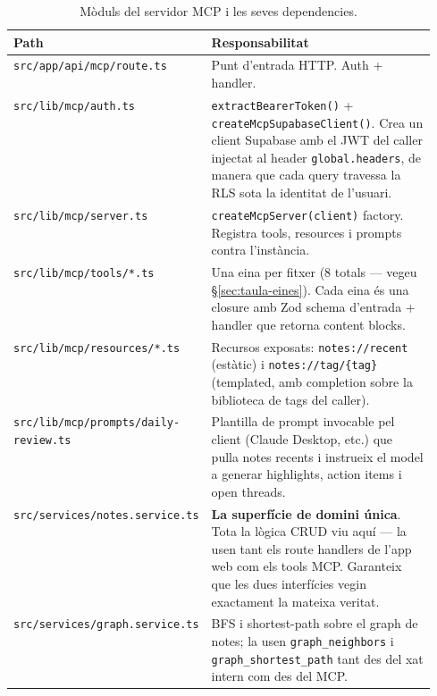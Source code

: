 \begin{table}[H]
    \centering
    \footnotesize
    \begin{tabular}{|l|p{0.55\linewidth}|}
        \hline
        \textbf{Path} & \textbf{Responsabilitat} \\
        \hline
        \texttt{src/app/api/mcp/route.ts} &
            Punt d'entrada HTTP. Auth + handler. \\
        \texttt{src/lib/mcp/auth.ts} &
            \texttt{extractBearerToken()} +
            \texttt{createMcpSupabaseClient()}. Crea un client
            Supabase amb el JWT del caller injectat al header
            \texttt{global.headers}, de manera que cada query
            travessa la RLS sota la identitat de l'usuari. \\
        \texttt{src/lib/mcp/server.ts} &
            \texttt{createMcpServer(client)} factory. Registra
            tools, resources i prompts contra l'instància. \\
        \texttt{src/lib/mcp/tools/*.ts} &
            Una eina per fitxer (8 totals --- vegeu
            \S\ref{sec:taula-eines}). Cada eina és una closure
            amb Zod schema d'entrada + handler que retorna
            content blocks. \\
        \texttt{src/lib/mcp/resources/*.ts} &
            Recursos exposats: \texttt{notes://recent} (estàtic) i
            \texttt{notes://tag/\{tag\}} (templated, amb
            completion sobre la biblioteca de tags del caller). \\
        \texttt{src/lib/mcp/prompts/daily-review.ts} &
            Plantilla de prompt invocable pel client (Claude
            Desktop, etc.) que pulla notes recents i instrueix
            el model a generar highlights, action items i open
            threads. \\
        \texttt{src/services/notes.service.ts} &
            \textbf{La superfície de domini única}. Tota la lògica
            CRUD viu aquí --- la usen tant els route handlers de
            l'app web com els tools MCP. Garanteix que les dues
            interfícies vegin exactament la mateixa veritat. \\
        \texttt{src/services/graph.service.ts} &
            BFS i shortest-path sobre el graph de notes; la usen
            \texttt{graph\_neighbors} i \texttt{graph\_shortest\_path}
            tant des del xat intern com des del MCP. \\
        \hline
    \end{tabular}
    \caption{Mòduls del servidor MCP i les seves dependencies.}
    \label{tab:mcp-moduls}
\end{table}

